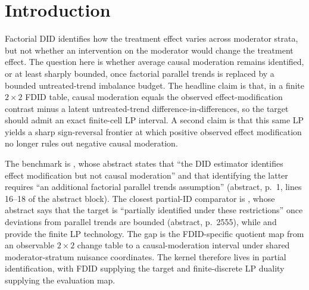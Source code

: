 \documentclass[11pt]{article}
\theoremstyle{definition}
\theoremstyle{plain}
\theoremstyle{remark}
\begin{document}
\begin{abstract}
Factorial difference-in-differences separates effect modification from causal moderation, but the published point-identification result requires exact factorial parallel trends. This proposal asks what the identified set for average causal moderation becomes when moderator-stratum untreated trends are allowed to differ by a bounded finite-cell budget. The key decomposition writes causal moderation as the observed FDID effect-modification contrast minus the untreated-trend difference-in-differences formed by two latent imbalance coordinates. The open flagship claim is that the projection of the full six-coordinate completion problem onto causal moderation is exactly the two-coordinate LP interval induced by those imbalance budgets, with a matching dual certificate. In that quotient problem the support value is \(\min\{\rho_\ast,\rho_0+\rho_1\}\), so a positive observed FDID contrast can coexist with negative causal moderation once the pooled imbalance budget exceeds the observed contrast. Resolving the projection claim would turn the recent FDID distinction between associative and causal moderation into a computable partial-identification object.
\end{abstract}

\section{Introduction}
Factorial DID identifies how the treatment effect varies across moderator strata, but not whether an intervention on the moderator would change the treatment effect. The question here is whether average causal moderation remains identified, or at least sharply bounded, once factorial parallel trends is replaced by a bounded untreated-trend imbalance budget. The headline claim is that, in a finite \(2\times 2\) FDID table, causal moderation equals the observed effect-modification contrast minus a latent untreated-trend difference-in-differences, so the target should admit an exact finite-cell LP interval. A second claim is that this same LP yields a sharp sign-reversal frontier at which positive observed effect modification no longer rules out negative causal moderation.

The benchmark is \citet{XuZhaoDing2026FDID}, whose abstract states that ``the DID estimator identifies effect modification but not causal moderation'' and that identifying the latter requires ``an additional factorial parallel trends assumption'' (abstract, p.~1, lines 16--18 of the abstract block). The closest partial-ID comparator is \citet{RambachanRoth2023ParallelTrends}, whose abstract says that the target is ``partially identified under these restrictions'' once deviations from parallel trends are bounded (abstract, p.~2555), while \citet{BalkePearl1997Bounds} and \citet{Demuynck2015LPBounds} provide the finite LP technology. The gap is the FDID-specific quotient map from an observable \(2\times 2\) change table to a causal-moderation interval under shared moderator-stratum nuisance coordinates. The kernel therefore lives in partial identification, with FDID supplying the target and finite-discrete LP duality supplying the evaluation map.
\end{document}
